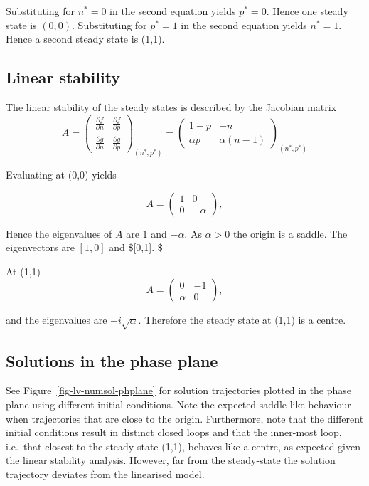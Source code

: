 \documentclass[
  letterpaper,
  DIV=11,
  numbers=noendperiod]{scrreprt}
\begin{document}
Substituting for \(n^*=0\) in the second equation yields \(p^*=0\).
Hence one steady state is \((0,0)\). Substituting for \(p^*=1\) in the
second equation yields \(n^*=1\). Hence a second steady state is (1,1).

\hypertarget{linear-stability-3}{%
\subsection{Linear stability}\label{linear-stability-3}}

The linear stability of the steady states is described by the Jacobian
matrix \[
A=\left(\begin{array}{rr}
\frac{\partial f}{\partial n}&\frac{\partial f}{\partial p} \\ \frac{\partial g}{\partial n}&\frac{\partial g}{\partial p} \end{array}\right)_{(n^*,p^*)} = \left(\begin{array}{rr}
1-p&-n \\ \alpha p &\alpha (n-1) \end{array}\right)_{(n^*,p^*)} 
\]

Evaluating at (0,0) yields

\[
A=\left(\begin{array}{rr} 1&0 \\ 0 &-\alpha \end{array}\right),
\]

Hence the eigenvalues of \(A\) are \(1\) and \(-\alpha\). As
\(\alpha>0\) the origin is a saddle. The eigenvectors are \([1, 0]\) and
\${[}0,1{]}. \$

At (1,1) \[
A=\left(\begin{array}{rr} 0&-1 \\ \alpha &0 \end{array}\right),
\]

and the eigenvalues are \(\pm i\sqrt{\alpha}\). Therefore the steady
state at (1,1) is a centre.

\hypertarget{solutions-in-the-phase-plane}{%
\subsection{Solutions in the phase
plane}\label{solutions-in-the-phase-plane}}

See Figure~\ref{fig-lv-numsol-phplane} for solution trajectories plotted
in the phase plane using different initial conditions. Note the expected
saddle like behaviour when trajectories that are close to the origin.
Furthermore, note that the different initial conditions result in
distinct closed loops and that the inner-most loop, i.e.~that closest to
the steady-state (1,1), behaves like a centre, as expected given the
linear stability analysis. However, far from the steady-state the
solution trajectory deviates from the linearised model.
\end{document}
